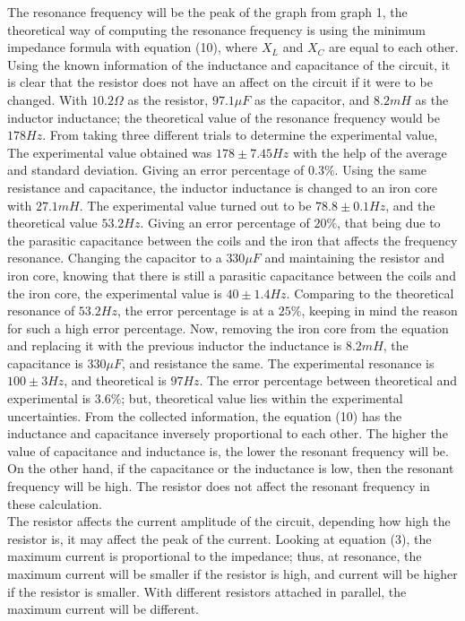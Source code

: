 \documentclass[11pt]{article}
\begin{document}
The resonance frequency will be the peak of the graph from graph 1, the theoretical way of computing the resonance frequency is using the minimum impedance formula with equation (10), where $X_L$ and $X_C$ are equal to each other. Using the known information of the inductance and capacitance of the circuit, it is clear that the resistor does not have an affect on the circuit if it were to be changed. With $10.2 \Omega$ as the resistor, $97.1 \mu F$ as the capacitor, and $8.2mH$ as the inductor inductance; the theoretical value of the resonance frequency would be $178 Hz$. From taking three different trials to determine the experimental value, The experimental value obtained was $178\pm7.45 Hz$ with the help of the average and standard deviation. Giving an error percentage of $0.3\%$. Using the same resistance and capacitance, the inductor inductance is changed to an iron core with $27.1 mH$. The experimental value turned out to be $78.8\pm 0.1 Hz$, and the theoretical value $53.2 Hz$. Giving an error percentage of $20\%$, that being due to the parasitic capacitance between the coils and the iron that affects the frequency resonance. Changing the capacitor to a $330\mu F$ and maintaining the resistor and iron core, knowing that there is still a parasitic capacitance between the coils and the iron core, the experimental value is $40 \pm 1.4 Hz$. Comparing to the theoretical resonance of $53.2 Hz$, the error percentage is at a $25\%$, keeping in mind the reason for such a high error percentage. Now, removing the iron core from the equation and replacing it with the previous inductor the inductance is $8.2 mH$, the capacitance is $330 \mu F$, and resistance the same. The experimental resonance is $100 \pm 3 Hz$, and theoretical is $97 Hz$. The error percentage between theoretical and experimental is $3.6\%$; but, theoretical value lies within the experimental uncertainties. From the collected information, the equation (10) has the inductance and capacitance inversely proportional to each other. The higher the value of capacitance and inductance is, the lower the resonant frequency will be. On the other hand, if the capacitance or the inductance is low, then the resonant frequency will be high. The resistor does not affect the resonant frequency in these calculation.\\

The resistor affects the current amplitude of the circuit, depending how high the resistor is, it may affect the peak of the current. Looking at equation (3), the maximum current is proportional to the impedance; thus, at resonance, the maximum current will be smaller if the resistor is high, and current will be higher if the resistor is smaller. With different resistors attached in parallel, the maximum current will be different. \\
\end{document}
